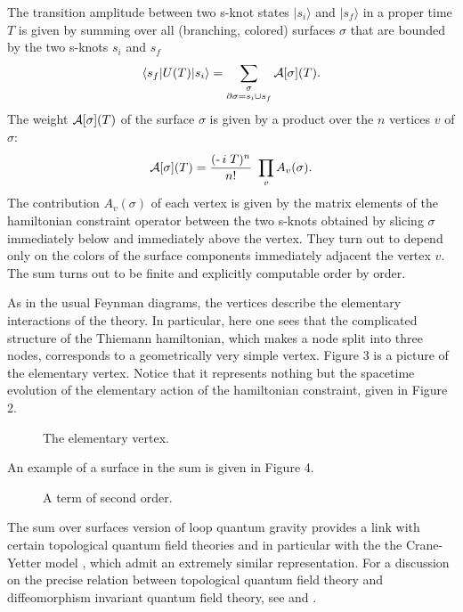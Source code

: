 The transition amplitude between two s-knot states 
$|s_{i}\rangle$ and $|s_{f}\rangle$ in a proper time $T$ is given 
by summing over all (branching, colored) surfaces $\sigma$ 
that are bounded by the two s-knots $s_{i}$ and $s_{f}$ 
 \begin{equation}
\langle s_{f}|U(T)|s_{i}\rangle  =
\sum_{\stackrel{\scriptstyle\sigma}
{\scriptstyle\partial\sigma=s_i\cup s_f}}
 {\cal A}[\sigma](T)
\label{uno}. 
 \end{equation}
The weight ${\cal A}[\sigma](T)$ of the surface $\sigma$ is given 
by a product over the $n$ vertices $v$ of $\sigma$: 
\begin{equation} 
{\cal A}[\sigma](T)= {(\mbox{\rm - 
}\!i\;T)^{n}\over n!}\ \prod_{v} A_v(\sigma).
\label{due}
\end{equation} 
The contribution $A_v(\sigma)$ of each vertex is given by the 
matrix elements of the hamiltonian constraint operator between the 
two s-knots obtained by slicing $\sigma$ immediately below and 
immediately above the vertex.  They turn out to depend only on the 
colors of the surface components immediately adjacent the vertex 
$v$.  The sum turns out to be finite and explicitly computable 
order by order.

As in the usual Feynman diagrams, the vertices describe the 
elementary interactions of the theory.  In particular, here one 
sees that the complicated structure of the Thiemann hamiltonian, 
which makes a node split into three nodes, corresponds to a 
geometrically very simple vertex.  Figure 3 is a picture of the 
elementary vertex.  Notice that it represents nothing but the 
spacetime evolution of the elementary action of the hamiltonian 
constraint, given in Figure 2.

\begin{figure} 
\centerline{\mbox{}} 
\caption{The elementary vertex.} 
\end{figure}

An example of a surface in the sum is given in Figure 4.

\begin{figure} \centerline{\mbox{}}
 \caption{A term of second order.}
\end{figure}

The sum over surfaces version of loop quantum gravity provides a 
link with certain topological quantum field theories and in 
particular with the the Crane-Yetter model 
\cite{Crane1,Crane2,CraneFrenkel,CraneKauffmanYetter,CraneYetter}, 
which admit an extremely similar representation.  For a 
discussion on the precise relation between topological quantum 
field theory and diffeomorphism invariant quantum field theory, 
see \cite{ReisenbergerRovelli} and 
\cite{RovelliPonzano,Iwasaki,Foxon}.

